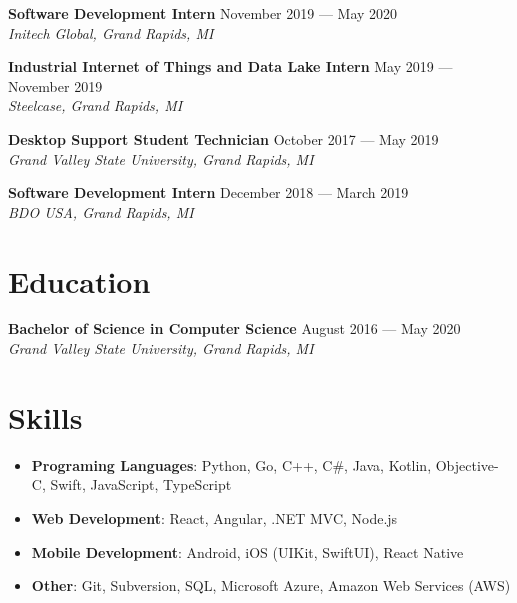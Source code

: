 \documentclass{article}
\begin{document}
\textbf{Software Development Intern} \hfill November 2019 --- May 2020\\
\textit{Initech Global, Grand Rapids, MI}
\medskip


\textbf{Industrial Internet of Things and Data Lake Intern}
\hfill May 2019 --- November 2019\\
\textit{Steelcase, Grand Rapids, MI}
\medskip


\textbf{Desktop Support Student Technician} \hfill October 2017 --- May 2019\\
\textit{Grand Valley State University, Grand Rapids, MI}
\medskip

\textbf{Software Development Intern} \hfill December 2018 --- March 2019\\
\textit{BDO USA, Grand Rapids, MI}
\medskip


\section*{Education}
\textbf{Bachelor of Science in Computer Science} \hfill August 2016 --- May 2020\\
\textit{Grand Valley State University, Grand Rapids, MI}

\section*{Skills}
\begin{itemize}
\item \textbf{Programing Languages}: Python, Go, C++, C\#, Java, Kotlin, Objective-C, Swift, JavaScript, TypeScript
\item \textbf{Web Development}: React, Angular, .NET MVC, Node.js
\item \textbf{Mobile Development}: Android, iOS (UIKit, SwiftUI), React Native
\item \textbf{Other}: Git, Subversion, SQL, Microsoft Azure, Amazon Web Services (AWS)
\end{itemize}
\end{document}
